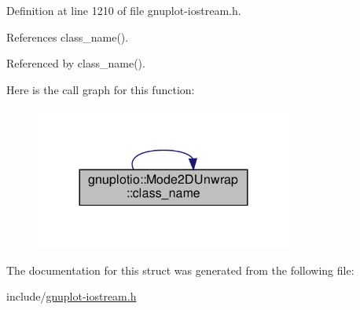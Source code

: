 Definition at line 1210 of file gnuplot-\/iostream.\+h.



References class\+\_\+name().



Referenced by class\+\_\+name().

Here is the call graph for this function\+:\nopagebreak
\begin{figure}[H]
\begin{center}
\leavevmode
\includegraphics[width=240pt]{structgnuplotio_1_1_mode2_d_unwrap_ab2f533c9ceb52cfecaa161c64316deb9_cgraph}
\end{center}
\end{figure}


The documentation for this struct was generated from the following file\+:\begin{DoxyCompactItemize}
\item 
include/\hyperlink{gnuplot-iostream_8h}{gnuplot-\/iostream.\+h}\end{DoxyCompactItemize}
